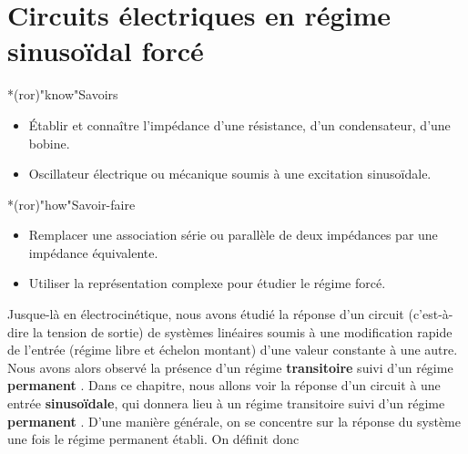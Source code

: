 \documentclass[../../main/main.tex]{subfiles}
\begin{document}
\setcounter{chapter}{4}

\chapter{Circuits \'electriques en r\'egime sinuso\"idal forc\'e}

\vfill

\begin{prgm}
	\begin{tcb}*(ror)"know"{Savoirs}
		\begin{itemize}[label=$\diamond$, leftmargin=10pt]
			\item Établir et connaître l'impédance d'une résistance, d'un
			      condensateur, d'une bobine.
			\item Oscillateur électrique ou mécanique soumis à une excitation
			      sinusoïdale.
		\end{itemize}
	\end{tcb}

	\begin{tcb}*(ror)"how"{Savoir-faire}
		\begin{itemize}[label=$\diamond$, leftmargin=10pt]
			\item Remplacer une association série ou parallèle de deux impédances par
			      une impédance équivalente.
			\item Utiliser la représentation complexe pour étudier le régime forcé.
		\end{itemize}
	\end{tcb}
\end{prgm}

\vfill
\minitoc
\vfill

\newpage

Jusque-là en électrocinétique, nous avons étudié la réponse d'un circuit
(c'est-à-dire la tension de sortie) de systèmes linéaires soumis à une
modification rapide de l'entrée (régime libre et échelon montant) d'une valeur
constante à une autre. Nous avons alors observé la présence d'un régime
\textbf{transitoire} suivi d'un régime \textbf{permanent }.
Dans ce chapitre, nous allons voir la réponse d'un circuit à une entrée
\textbf{sinusoïdale}, qui donnera lieu à un régime transitoire suivi d'un régime
\textbf{permanent }. D'une manière générale, on se
concentre sur la réponse du système une fois le régime permanent établi. On
définit donc
\end{document}
